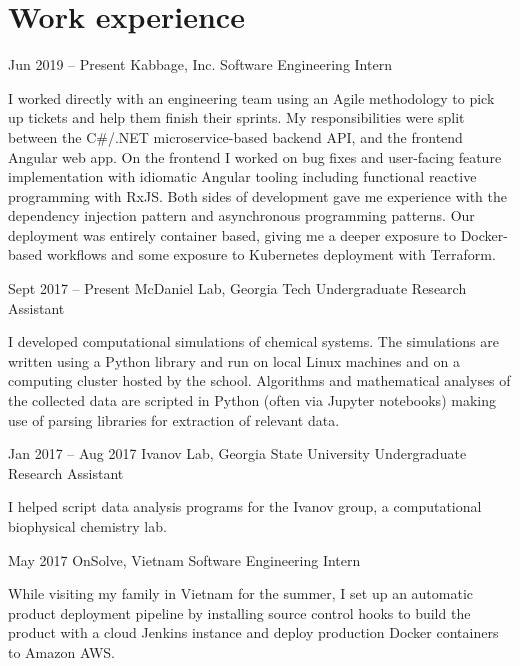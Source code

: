 \documentclass{tccv}
\begin{document}
\begin{minipage}[t]{0.65\textwidth}
\section{Work experience}

\begin{eventlist}

\item{Jun 2019 -- Present}
     {Kabbage, Inc.}
     {Software Engineering Intern}
    
    I worked directly with an engineering team using an Agile methodology to pick up tickets and help them finish their sprints. My responsibilities were split between the C\#/.NET microservice-based backend API, and the frontend Angular web app. On the frontend I worked on bug fixes and user-facing feature implementation with idiomatic Angular tooling including functional reactive programming with RxJS. Both sides of development gave me experience with the dependency injection pattern and asynchronous programming patterns. Our deployment was entirely container based, giving me a deeper exposure to Docker-based workflows and some exposure to Kubernetes deployment with Terraform.

\item{Sept 2017 -- Present}
     {McDaniel Lab, Georgia Tech}
     {Undergraduate Research Assistant}

    I developed computational simulations of chemical systems. The simulations are written using a Python library and run on local Linux machines and on a computing cluster hosted by the school. Algorithms and mathematical analyses of the collected data are scripted in Python (often via Jupyter notebooks) making use of parsing libraries for extraction of relevant data.

\item{Jan 2017 -- Aug 2017}
     {Ivanov Lab, Georgia State University}
     {Undergraduate Research Assistant}

    I helped script data analysis programs for the Ivanov group, a computational biophysical chemistry lab.

\item{May 2017}
     {OnSolve, Vietnam}
     {Software Engineering Intern}

    While visiting my family in Vietnam for the summer, I set up an automatic product deployment pipeline by installing source control hooks to build the product with a cloud Jenkins instance and deploy production Docker containers to Amazon AWS.


\end{eventlist}
\end{minipage}
\end{document}
